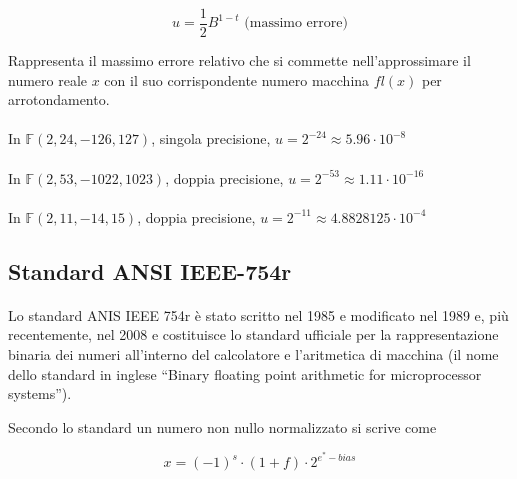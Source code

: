 \documentclass[a4paper, 11pt]{article}
\begin{document}
        \[
            u = \frac{1}{2} B^{1-t} \text{   (massimo errore)}
        \]  



        Rappresenta  il massimo errore relativo che si
        commette nell’approssimare il numero reale $x$ con il suo corrispondente numero macchina $fl(x)$ per arrotondamento.

        \paragraph{}
        In  $\mathbb{F}(2, 24,-126,127)$, singola precisione, $u = 2^{-24}\approx5.96\cdot10^{-8}$

        \paragraph{}
        In  $\mathbb{F}(2, 53,-1022,1023)$, doppia precisione, $u = 2^{-53}\approx1.11\cdot10^{-16}$
        \paragraph{}
        In  $\mathbb{F}(2, 11,-14, 15)$, doppia precisione, $u = 2^{-11}\approx4.8828125\cdot10^{-4}$











        \break
        \subsection{Standard ANSI IEEE-754r}

        \paragraph{}
        Lo standard ANIS IEEE 754r è stato scritto nel 1985 e modificato nel 1989 e, più recentemente, nel 2008 e costituisce lo standard ufficiale per la rappresentazione binaria dei numeri
        all’interno del calcolatore e l’aritmetica di macchina (il nome dello standard
        in inglese “Binary floating point arithmetic for microprocessor systems”).

        Secondo lo standard un numero non nullo normalizzato si scrive come



        \[
            x =(-1)^s \cdot (1+f)\cdot2^{e^*-bias}
        \]
        
\end{document}
